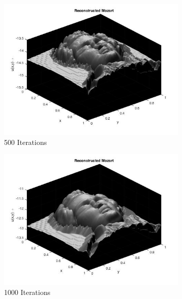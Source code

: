 \begin{center}
\begin{figure}
\begin{subfigure}{0.5\textwidth}
			\centering
			\includegraphics[scale = 0.4]{Images/moz/moz_500.jpg}
			\caption{500 Iterations}
		\end{subfigure}
		\begin{subfigure}{0.5\textwidth}
			\centering
			\includegraphics[scale = 0.4]{Images/moz/moz_1000.jpg}
			\caption{1000 Iterations}
		\end{subfigure}
		\begin{subfigure}{0.5\textwidth}
			\centering

\end{subfigure}
\end{figure}
\end{center}
